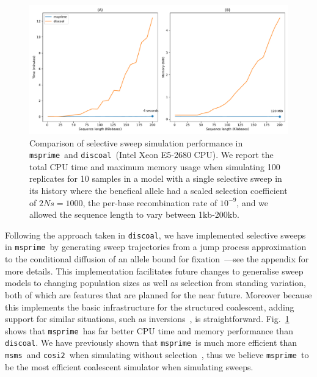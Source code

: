 \documentclass{article}
\newcommand{\msprime}[0]{\texttt{msprime}}
\newcommand{\msms}[0]{\texttt{msms}}
\newcommand{\cosiTwo}[0]{\texttt{cosi2}}
\newcommand{\discoal}[0]{\texttt{discoal}}
\begin{document}
\begin{figure}
\begin{center}
\includegraphics[width=\textwidth]{figures/sweeps-perf}
\end{center}
\caption{\label{fig-selection-perf}Comparison of selective sweep simulation
performance in \msprime\ and \discoal\ (Intel Xeon E5-2680 CPU).
We report the total CPU time and maximum memory usage when simulating 100
replicates for 10 samples in a model
with a single selective sweep in its history where the benefical
allele had a scaled selection coefficient of $2Ns=1000$,
the per-base recombination rate of $10^{-9}$, and we allowed
the sequence length to vary between 1kb-200kb.}
\end{figure}

Following the approach taken in \discoal, we
have implemented selective sweeps in \msprime\ by generating
sweep trajectories from a jump process approximation to the conditional diffusion
of an allele bound for
fixation~\citep{coop2004ancestral}---see the appendix for more details.
This implementation facilitates future changes to generalise sweep models to
changing population sizes as well as selection from standing variation,
both of which are features that are planned for the near future.
Moreover because this implements the basic infrastructure for the structured
coalescent, adding support for similar situations,
such as inversions~\citep{peischl2013sequential}, is straightforward.
Fig.~\ref{fig-selection-perf} shows that \msprime\ has far better
CPU time and memory performance than \discoal. We have previously shown
that \msprime\ is much more efficient than \msms\ and \cosiTwo\
when simulating without selection~\citep{kelleher2016efficient},
thus we believe \msprime\ to be the most efficient
coalescent simulator when simulating sweeps.
\end{document}
